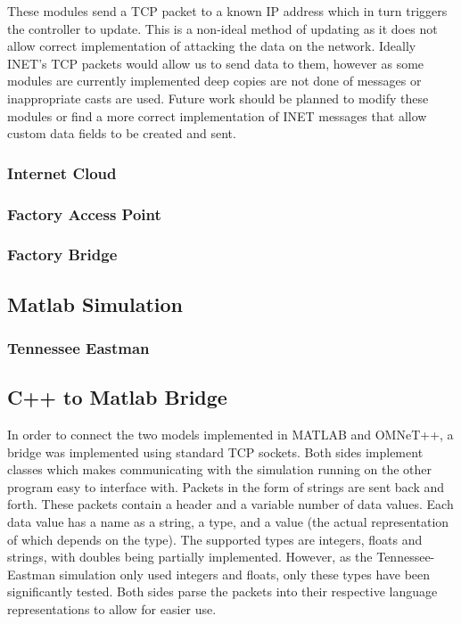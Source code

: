 These modules send a TCP packet to a known IP address which in turn triggers the controller to update. This is a non-ideal method of updating as it does not allow correct implementation of attacking the data on the network. Ideally INET's TCP packets would allow us to send data to them, however as some modules are currently implemented deep copies are not done of messages or inappropriate casts are used. Future work should be planned to modify these modules or find a more correct
implementation of INET messages that allow custom data fields to be created and sent. 

\subsubsection{Internet Cloud}

\subsubsection{Factory Access Point}

\subsubsection{Factory Bridge}

\subsection{Matlab Simulation}

\subsubsection{Tennessee Eastman}

\subsection{C++ to Matlab Bridge}

In order to connect the two models implemented in MATLAB and OMNeT++, a bridge was implemented using standard TCP sockets. Both sides implement classes which makes communicating with the simulation running on the other program easy to interface with. Packets in the form of strings are sent back and forth. These packets contain a header and a variable number of data values. Each data value has a name as a string, a type, and a value (the actual representation of which depends on the type). The supported types are integers, floats and strings, with doubles being partially implemented. However, as the Tennessee-Eastman simulation only used integers and floats, only these types have been significantly tested. Both sides parse the packets into their respective language representations to allow for easier use.

